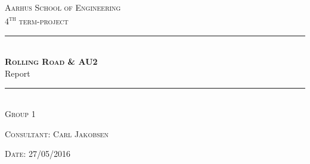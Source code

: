 \newcommand{\HRule}{\rule{\linewidth}{0.1mm}} %

\begin{center}
	
	\textsc{\LARGE Aarhus School of Engineering}\\[1.5cm] %
	
	\textsc{\large 4\textsuperscript{th} term-project}\\[2.5cm] 
	\HRule \\[0.8cm]
	{\huge \bfseries \textsc{Rolling Road \& AU2}} \\[0.5cm]{\LARGE Report} \\[0.4cm]
	\HRule \\[1.5cm]
	
	\textsc{\large Group 1}\\
	\vspace{0.5 in}
	\begin{center}
		
	\end{center}
	\vspace{0.5 in}
	
	\textsc{\large Consultant: Carl Jakobsen}
	\vspace{0.5 in}
	
	\textsc{\large Date: 27/05/2016}\\
	
\end{center} %

\newpage